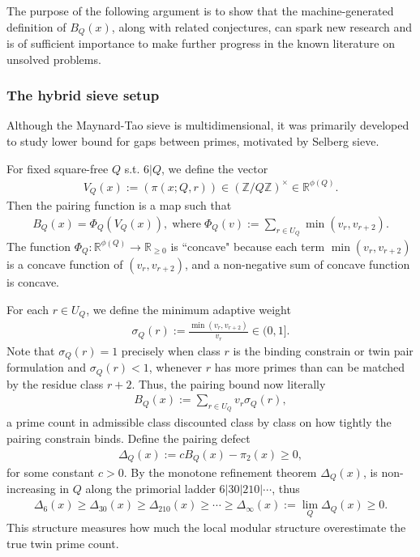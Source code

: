 \documentclass[11pt,reqno]{amsart}
\theoremstyle{plain}\newtheorem{theorem}{Theorem}[section]
\numberwithin{equation}{section}
\begin{document}
\medskip

The purpose of the following argument is to show that the machine-generated definition of $B_Q(x)$, along with related conjectures, can spark new research and is of sufficient importance to make further progress in the known literature on unsolved problems.

\subsubsection{The hybrid sieve setup}\label{hybridsieve} 

Although the Maynard-Tao sieve is multidimensional, it was primarily developed to study lower bound for gaps between primes, motivated by Selberg sieve. 

\medskip
\noindent
For fixed square-free $Q$ s.t. $6|Q$, we define the vector
\begin{align*}
V_{Q}(x):=(\pi(x;Q,r))\in (\mathbb{Z}/Q\mathbb{Z})^{\times} \in \mathbb{R}^{\phi(Q)}.
\end{align*}
\noindent
Then the pairing function is a map such that
\begin{align*}
B_Q(x)
=\Phi_Q(V_Q(x)), \;\text{where}\; \Phi_Q(v):= \sum_{r\in U_Q}\min(v_r,v_{r+2}).
\end{align*}
\noindent
The function $\Phi_Q: \mathbb{R}^{\phi(Q)} \to \mathbb{R}_{\geq 0}$ is ``concave" because each term $\min(v_r,v_{r+2})$ is a concave function of $(v_r,v_{r+2})$, and a non-negative sum of concave function is concave. 

\medskip
\noindent
For each $r\in U_Q$, we define the minimum adaptive weight
\begin{align*}
\sigma_{Q}(r)
:=
\frac{\min(v_r,v_{r+2})}{v_r}\in (0,1].
\end{align*}
\noindent
Note that $\sigma_Q(r)=1$ precisely when class $r$ is the binding constrain or twin pair formulation and $\sigma_Q(r)<1$, whenever $r$ has more primes than can be matched by the residue class $r+2$. Thus, the pairing bound now literally 
\begin{align*}
B_Q(x)
:=\sum_{r\in U_Q}v_r \sigma_Q(r),
\end{align*}
\noindent
a prime count in admissible class discounted class by class on how tightly the pairing constrain binds. Define the pairing defect 
\begin{align*}
\Delta_{Q}(x):= cB_Q(x)-\pi_2(x)\geq 0,    
\end{align*}
for some constant $c>0$. By the monotone refinement theorem $\Delta_Q(x)$, is non-increasing in $Q$ along the primorial ladder $6|30|210|\cdots$, thus 
\begin{align*}
\Delta_6(x)\geq \Delta_{30}(x)\geq \Delta_{210}(x)\geq \cdots\geq\Delta_{\infty}(x):= \lim_{Q}\Delta_Q(x)\geq 0.
\end{align*}
\noindent
This structure measures how much the local modular structure overestimate the true twin prime count.
\end{document}
